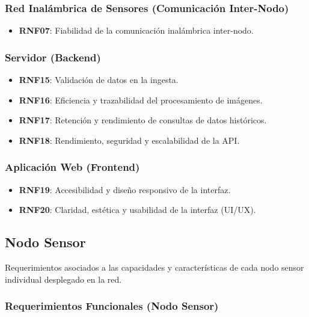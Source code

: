 \subsubsection*{Red Inalámbrica de Sensores (Comunicación Inter-Nodo)}
\begin{itemize}
    \item \textbf{RNF07}: Fiabilidad de la comunicación inalámbrica inter-nodo.
\end{itemize}

\subsubsection*{Servidor (Backend)}
\begin{itemize}
    \item \textbf{RNF15}: Validación de datos en la ingesta.
    \item \textbf{RNF16}: Eficiencia y trazabilidad del procesamiento de imágenes.
    \item \textbf{RNF17}: Retención y rendimiento de consultas de datos históricos.
    \item \textbf{RNF18}: Rendimiento, seguridad y escalabilidad de la API.
\end{itemize}

\subsubsection*{Aplicación Web (Frontend)}
\begin{itemize}
    \item \textbf{RNF19}: Accesibilidad y diseño responsivo de la interfaz.
    \item \textbf{RNF20}: Claridad, estética y usabilidad de la interfaz (UI/UX).
\end{itemize}

\subsection{Nodo Sensor}
\label{subsec:req_nodo_sensor}

Requerimientos asociados a las capacidades y características de cada nodo sensor individual desplegado en la red.

\subsubsection{Requerimientos Funcionales (Nodo Sensor)}

